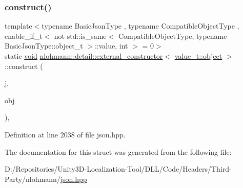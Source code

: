 \subsubsection{\texorpdfstring{construct()}{construct()}\hspace{0.1cm}{\footnotesize\ttfamily [3/3]}}
{\footnotesize\ttfamily template$<$typename Basic\+Json\+Type , typename Compatible\+Object\+Type , enable\+\_\+if\+\_\+t$<$ not std\+::is\+\_\+same$<$ Compatible\+Object\+Type, typename Basic\+Json\+Type\+::object\+\_\+t $>$\+::value, int $>$  = 0$>$ \\
static \mbox{\hyperlink{namespacenlohmann_1_1detail_a59fca69799f6b9e366710cb9043aa77d}{void}} \mbox{\hyperlink{structnlohmann_1_1detail_1_1external__constructor}{nlohmann\+::detail\+::external\+\_\+constructor}}$<$ \mbox{\hyperlink{namespacenlohmann_1_1detail_a1ed8fc6239da25abcaf681d30ace4985aa8cfde6331bd59eb2ac96f8911c4b666}{value\+\_\+t\+::object}} $>$\+::construct (\begin{DoxyParamCaption}\item[{Basic\+Json\+Type \&}]{j,  }\item[{const Compatible\+Object\+Type \&}]{obj }\end{DoxyParamCaption})\hspace{0.3cm}{\ttfamily [inline]}, {\ttfamily [static]}}



Definition at line 2038 of file json.\+hpp.



The documentation for this struct was generated from the following file\+:\begin{DoxyCompactItemize}
\item 
D\+:/\+Repositories/\+Unity3\+D-\/\+Localization-\/\+Tool/\+D\+L\+L/\+Code/\+Headers/\+Third-\/\+Party/nlohmann/\mbox{\hyperlink{json_8hpp}{json.\+hpp}}\end{DoxyCompactItemize}
